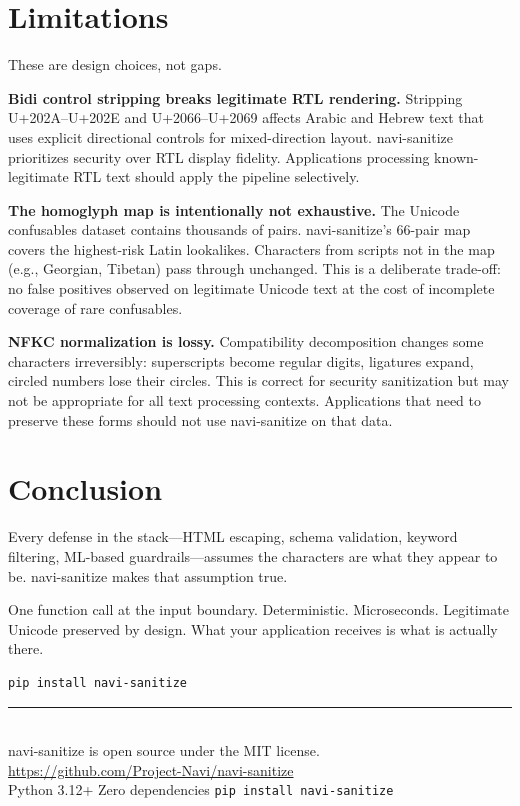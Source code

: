 \documentclass[11pt,letterpaper]{article}
\begin{document}
\section{Limitations}

These are design choices, not gaps.

\textbf{Bidi control stripping breaks legitimate RTL rendering.} Stripping U+202A--U+202E and U+2066--U+2069 affects Arabic and Hebrew text that uses explicit directional controls for mixed-direction layout. navi-sanitize prioritizes security over RTL display fidelity. Applications processing known-legitimate RTL text should apply the pipeline selectively.

\textbf{The homoglyph map is intentionally not exhaustive.} The Unicode confusables dataset contains thousands of pairs. navi-sanitize's 66-pair map covers the highest-risk Latin lookalikes. Characters from scripts not in the map (e.g., Georgian, Tibetan) pass through unchanged. This is a deliberate trade-off: no false positives observed on legitimate Unicode text at the cost of incomplete coverage of rare confusables.

\textbf{NFKC normalization is lossy.} Compatibility decomposition changes some characters irreversibly: superscripts become regular digits, ligatures expand, circled numbers lose their circles. This is correct for security sanitization but may not be appropriate for all text processing contexts. Applications that need to preserve these forms should not use navi-sanitize on that data.


\section{Conclusion}

Every defense in the stack---HTML escaping, schema validation, keyword filtering, ML-based guardrails---assumes the characters are what they appear to be. navi-sanitize makes that assumption true.

One function call at the input boundary. Deterministic. Microseconds. Legitimate Unicode preserved by design. What your application receives is what is actually there.

\begin{lstlisting}[language={}]
pip install navi-sanitize
\end{lstlisting}

\vspace{2em}

\begin{center}
\small\color{NaviGray}
\rule{0.3\textwidth}{0.4pt}\\[0.8em]
navi-sanitize is open source under the MIT license.\\
\url{https://github.com/Project-Navi/navi-sanitize}\\[0.3em]
Python 3.12+ \quad\textbullet\quad Zero dependencies \quad\textbullet\quad \texttt{pip install navi-sanitize}
\end{center}
\end{document}

